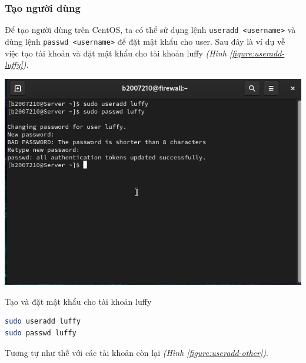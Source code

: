 \documentclass[a4paper, 11pt]{article}
\begin{document}
\subsubsection{Tạo người dùng}

Để tạo người dùng trên CentOS, ta có thể sử dụng lệnh \texttt{useradd <username>} và dùng lệnh \texttt{passwd <username>} để đặt mật khẩu cho user.
Sau đây là ví dụ về việc tạo tài khoản và đặt mật khẩu cho tài khoản luffy \textit{(Hình \ref{figure:useradd-luffy})}.

\begin{minipage}
    {\linewidth}
    \captionsetup{type=figure}
    \centering
    \includegraphics[width=\linewidth]{images/useradd-luffy.png}
    \caption{Tạo và đặt mật khẩu cho tài khoản luffy}
    \label{figure:useradd-luffy}
\end{minipage}

\begin{lstlisting}[language=bash, caption=Tạo và đặt mật khẩu cho tài khoản luffy]
sudo useradd luffy
sudo passwd luffy
\end{lstlisting}

Tương tự như thế với các tài khoản còn lại \textit{(Hình \ref{figure:useradd-other})}.
\end{document}
